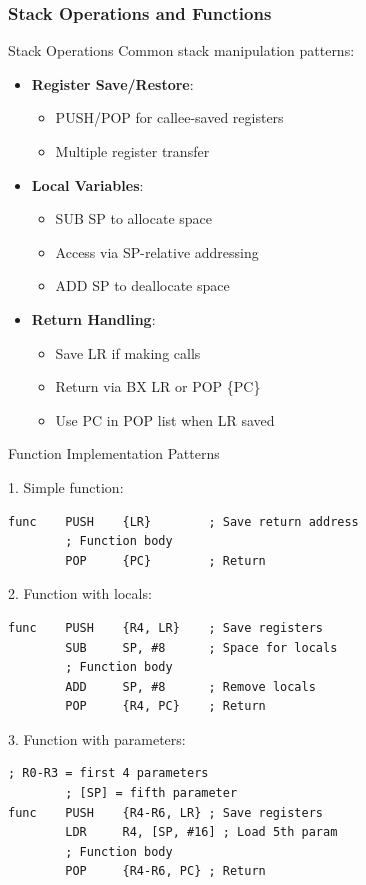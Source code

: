 \subsubsection{Stack Operations and Functions}

\begin{concept}{Stack Operations}
Common stack manipulation patterns:
\begin{itemize}
  \item \textbf{Register Save/Restore}:
    \begin{itemize}
      \item PUSH/POP for callee-saved registers
      \item Multiple register transfer
    \end{itemize}
  \item \textbf{Local Variables}:
    \begin{itemize}
      \item SUB SP to allocate space
      \item Access via SP-relative addressing
      \item ADD SP to deallocate space
    \end{itemize}
  \item \textbf{Return Handling}:
    \begin{itemize}
      \item Save LR if making calls
      \item Return via BX LR or POP \{PC\}
      \item Use PC in POP list when LR saved
    \end{itemize}
\end{itemize}
\end{concept}

\begin{KR}{Function Implementation Patterns}

1. Simple function:
\begin{lstlisting}[language=armasm, style=basesmol]
func    PUSH    {LR}        ; Save return address
        ; Function body
        POP     {PC}        ; Return
\end{lstlisting}

2. Function with locals:
\begin{lstlisting}[language=armasm, style=basesmol]
func    PUSH    {R4, LR}    ; Save registers
        SUB     SP, #8      ; Space for locals
        ; Function body
        ADD     SP, #8      ; Remove locals
        POP     {R4, PC}    ; Return
\end{lstlisting}

3. Function with parameters:
\begin{lstlisting}[language=armasm, style=basesmol]
        ; R0-R3 = first 4 parameters
        ; [SP] = fifth parameter
func    PUSH    {R4-R6, LR} ; Save registers
        LDR     R4, [SP, #16] ; Load 5th param
        ; Function body
        POP     {R4-R6, PC} ; Return
\end{lstlisting}
\end{KR}

